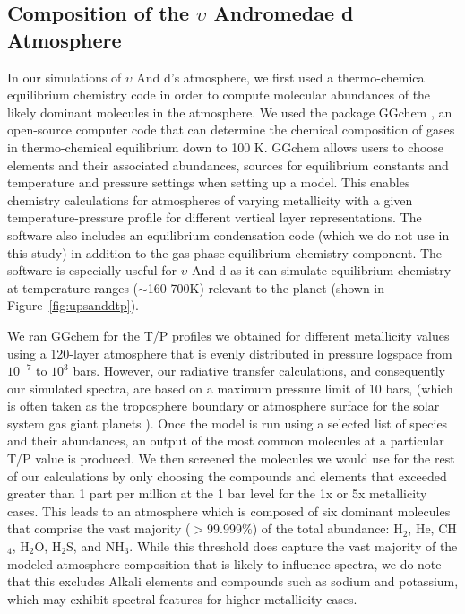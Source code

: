 \documentclass[12pt, letterpaper]{aastex631}
\begin{document}
\subsection{Composition of the $\upsilon$ Andromedae d Atmosphere} \label{subsec:composition}

In our simulations of $\upsilon$ And d's atmosphere, we first used a thermo-chemical equilibrium chemistry code in order to compute molecular abundances of the likely dominant molecules in the atmosphere.  We used the package GGchem \citep{2018A&A...614A...1W}, an open-source computer code that can determine the chemical composition of gases in thermo-chemical equilibrium down to 100 K.  GGchem allows users to choose elements and their associated abundances, sources for equilibrium constants and temperature and pressure settings when setting up a model.  This enables chemistry calculations for atmospheres of varying metallicity with a given temperature-pressure profile for different vertical layer representations.  The software also includes an equilibrium condensation code (which we do not use in this study) in addition to the gas-phase equilibrium chemistry component. The software is especially useful for $\upsilon$ And d as it can simulate equilibrium chemistry at temperature ranges ($\sim$160-700K) relevant to the planet (shown in Figure~\ref{fig:upsanddtp}).

We ran GGchem for the T/P profiles we obtained for different metallicity values using a 120-layer atmosphere that is evenly distributed in pressure logspace from $10^{-7}$ to $10^{3}$ bars.  However, our radiative transfer calculations, and consequently our simulated spectra, are based on a maximum pressure limit of 10 bars, (which is often taken as the troposphere boundary or atmosphere surface for the solar system gas giant planets \citep{1998JGR...10322857S, 2004ESASP1278..331E}). Once the model is run using a selected list of species and their abundances, an output of the most common molecules at a particular T/P value is produced. We then screened the molecules we would use for the rest of our calculations by only choosing the compounds and elements that exceeded greater than 1 part per million at the 1 bar level for the 1x or 5x metallicity cases. This leads to an atmosphere which is composed of six dominant molecules that comprise the vast majority ($>$99.999$\%$) of the total abundance:  H$_{2}$, He, CH$_{4}$, H$_{2}$O, H$_{2}$S, and NH$_{3}$. While this threshold does capture the vast majority of the modeled atmosphere composition that is likely to influence spectra, we do note that this excludes Alkali elements and compounds such as sodium and potassium, which may exhibit spectral features for higher metallicity cases.
\end{document}
